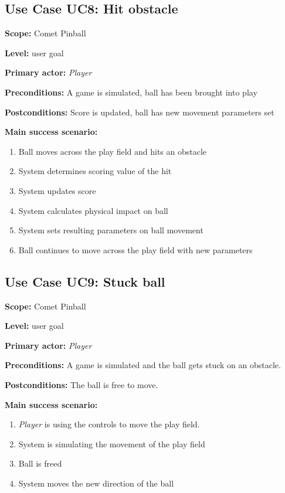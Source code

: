 \documentclass[fontsize=12pt,
               paper=a4,
               twoside=false,
               parskip=half,
               ]{scrartcl}
\begin{document}


\subsection{Use Case UC8: Hit obstacle}

\textbf{\textsf{Scope:}} Comet Pinball

\textbf{\textsf{Level:}} user goal

\textbf{\textsf{Primary actor:}} \emph{Player}

\textbf{\textsf{Preconditions:}} A game is simulated, ball has been brought into play

\textbf{\textsf{Postconditions:}} Score is updated, ball has new movement parameters set

\textbf{\textsf{Main success scenario:}}

\begin{enumerate}[leftmargin=3em]
	\item Ball moves across the play field and hits an obstacle
	\item System determines scoring value of the hit
	\item System updates score
	\item System calculates physical impact on ball
	\item System sets resulting parameters on ball movement
	\item Ball continues to move across the play field with new parameters
\end{enumerate}




\subsection{Use Case UC9: Stuck ball}

\textbf{\textsf{Scope:}} Comet Pinball

\textbf{\textsf{Level:}} user goal

\textbf{\textsf{Primary actor:}} \emph{Player}

\textbf{\textsf{Preconditions:}} A game is simulated and the ball gets stuck on an obstacle.

\textbf{\textsf{Postconditions:}} The ball is free to move.

\textbf{\textsf{Main success scenario:}}

\begin{enumerate}[leftmargin=3em]
	\item \emph{Player} is using the controls to move the play field.
	\item System is simulating the movement of the play field
	\item Ball is freed
	\item System moves the new direction of the ball
\end{enumerate}
\end{document}
